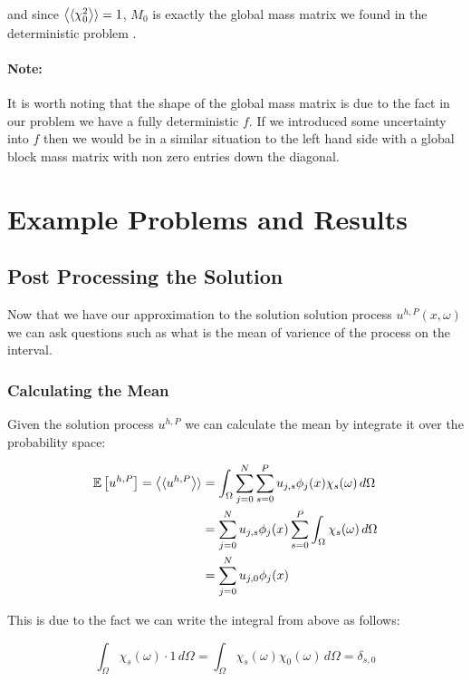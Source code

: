 and since $\left\langle\langle\chi_0^2\right\rangle\rangle = 1$, $M_0$ is exactly the global mass matrix we
found in the deterministic problem .

\paragraph{Note:}

It is worth noting that the shape of the global mass matrix is due to the fact
in our problem we have a fully deterministic $f$. If we introduced some
uncertainty into $f$ then we would be in a similar situation to the left hand
side with a global block mass matrix with non zero entries down the diagonal.

\section{Example Problems and Results}


\subsection{Post Processing the Solution}

Now that we have our approximation to the solution solution process
$u^{h,P}(x,\omega)$ we can ask questions such as what is the mean of varience
of the process on the interval.

\subsubsection{Calculating the Mean}

Given the solution process $u^{h,P}$ we can calculate the mean by integrate it
over the probability space:

\begin{align}
  \begin{split}
    \mathbb{E}\left[u^{h,P}\right] = \left\langle\langle u^{h,P}\right\rangle\rangle &=
    \int_\Omega\sum_{j=0}^N\sum_{s=0}^Pu_{j,s}\phi_j(x)\chi_s(\omega)\, d\Omega \\
    &= \sum_{j=0}^Nu_{j,s}\phi_j(x)\sum_{s=0}^P\int_\Omega\chi_s(\omega)\, d\Omega \\
    &= \sum_{j=0}^Nu_{j,0}\phi_j(x)
  \end{split}
\end{align}

This is due to the fact we can write the integral from above as follows:

\begin{equation}
    \int_\Omega\chi_s(\omega)\cdot 1\, d\Omega =
    \int_\Omega\chi_s(\omega)\chi_0(\omega)\, d\Omega = \delta_{s,0}
\end{equation}

